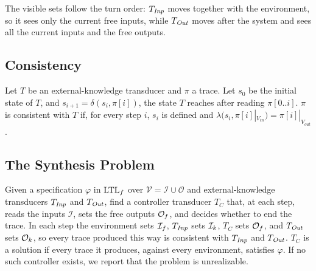 The visible sets follow the turn order: $T_{\mathit{Inp}}$ moves together with the environment, so it sees only the current free inputs, while $T_{\mathit{Out}}$ moves after the system and sees all the current inputs and the free outputs.



\subsection{Consistency}

\begin{definition}[Consistency]\label{def:consistency}
Let $T$ be an external-knowledge transducer and $\pi$ a trace.
Let $s_0$ be the initial state of $T$, and $s_{i+1} = \delta(s_i, \pi[i])$, the state $T$ reaches after reading $\pi[0..i]$.
$\pi$ is consistent with $T$ if, for every step $i$, $s_i$ is defined and $\lambda(s_i, \pi[i]|_{V_{in}}) = \pi[i]|_{V_{out}}$.
\end{definition}

\subsection{The Synthesis Problem}
\begin{definition}\label{def:problem}
Given a specification $\varphi$ in $\text{LTL}_f$ over $\mathcal{V} = \mathcal{I} \cup \mathcal{O}$ and external-knowledge transducers $T_{\mathit{Inp}}$ and $T_{\mathit{Out}}$, find a controller transducer $T_C$ that, at each step, reads the inputs $\mathcal{I}$, sets the free outputs $\mathcal{O}_{f}$, and decides whether to end the trace.
In each step the environment sets $\mathcal{I}_{f}$, $T_{\mathit{Inp}}$ sets $\mathcal{I}_{k}$, $T_C$ sets $\mathcal{O}_{f}$, and $T_{\mathit{Out}}$ sets $\mathcal{O}_{k}$, so every trace produced this way is consistent with $T_{\mathit{Inp}}$ and $T_{\mathit{Out}}$.
$T_C$ is a solution if every trace it produces, against every environment, satisfies $\varphi$.
If no such controller exists, we report that the problem is unrealizable.
\end{definition}

